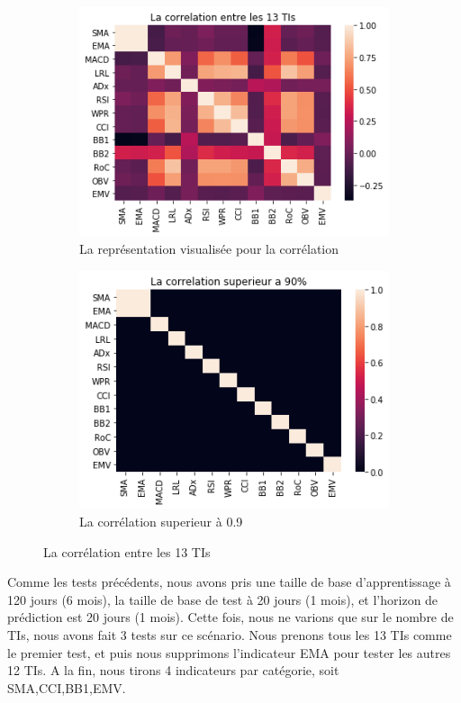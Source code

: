 \begin{figure}[H]
	\centering
	\begin{subfigure}{.5\textwidth}
	\includegraphics[width=.9\linewidth, scale=0.2]
	{plot/Corr.png}
	\caption{La représentation visualisée pour la corrélation}
	\label{fig:corr}
	\end{subfigure}%
	\begin{subfigure}{.5\textwidth}
	\centering
	\includegraphics[width=.9\linewidth, scale=0.2]
	{plot/corr_s.png}
	\caption{La corrélation superieur à 0.9}
	\label{fig:corr_s}
	\end{subfigure}
\caption{La corrélation entre les 13 TIs}
\label{fig:correlation}
\end{figure}

Comme les tests précédents, nous avons pris une taille de base d'apprentissage à 120 jours (6 mois), la taille de base de test à 20 jours (1 mois), et l'horizon de prédiction est 20 jours (1 mois). Cette fois, nous ne varions que sur le nombre de TIs, nous avons fait 3 tests sur ce scénario. Nous prenons tous les 13 TIs comme le premier test, et puis nous supprimons l'indicateur EMA pour tester les autres 12 TIs. A la fin, nous tirons 4 indicateurs par catégorie, soit SMA,CCI,BB1,EMV. \\

